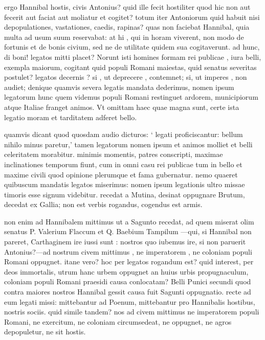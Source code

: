  ergo Hannibal hostis, civis Antonius? quid ille fecit hostiliter quod hic non aut fecerit aut faciat aut moliatur et cogitet? totum iter Antoniorum quid habuit nisi depopulationes, vastationes, caedis, rapinas? quas non faciebat Hannibal, quia multa ad usum suum reservabat: at hi , qui in horam viverent, non modo de fortunis et de bonis civium, sed ne de utilitate quidem sua cogitaverunt. ad hunc, di boni! legatos mitti placet? Norunt isti homines formam rei publicae , iura belli, exempla maiorum, cogitant quid populi Romani maiestas, quid senatus severitas postulet? legatos decernis ? si , ut deprecere , contemnet; si, ut imperes , non audiet; denique quamvis severa legatis mandata dederimus, nomen ipsum legatorum hunc quem videmus populi Romani restinguet ardorem, municipiorum atque Italiae franget animos. Vt omittam haec quae magna sunt, certe ista legatio moram et tarditatem adferet bello.

 quamvis dicant quod quosdam audio dicturos: ` legati proficiscantur: bellum nihilo minus paretur,' tamen legatorum nomen ipsum et animos molliet et belli celeritatem morabitur. minimis momentis, patres conscripti, maximae inclinationes temporum fiunt, cum in omni casu rei publicae tum in bello et maxime civili quod opinione plerumque et fama gubernatur. nemo quaeret quibuscum mandatis legatos miserimus: nomen ipsum legationis ultro missae timoris esse signum videbitur. recedat a Mutina, desinat oppugnare Brutum, decedat ex Gallia; non est verbis rogandus, cogendus est armis.

 non enim ad Hannibalem mittimus ut a Sagunto recedat, ad quem miserat olim senatus P. Valerium Flaccum et Q. Baebium Tampilum —qui, si Hannibal non pareret, Carthaginem ire iussi sunt : nostros quo iubemus ire, si non paruerit Antonius?—ad nostrum civem mittimus , ne imperatorem , ne coloniam populi Romani oppugnet. itane vero? hoc per legatos rogandum est? quid interest, per deos immortalis, utrum hanc urbem oppugnet an huius urbis propugnaculum, coloniam populi Romani praesidi causa conlocatam? Belli Punici secundi quod contra maiores nostros Hannibal gessit causa fuit Sagunti oppugnatio. recte ad eum legati missi: mittebantur ad Poenum, mittebantur pro Hannibalis hostibus, nostris sociis. quid simile tandem? nos ad civem mittimus ne imperatorem populi Romani, ne exercitum, ne coloniam circumsedeat, ne oppugnet, ne agros depopuletur, ne sit hostis.

